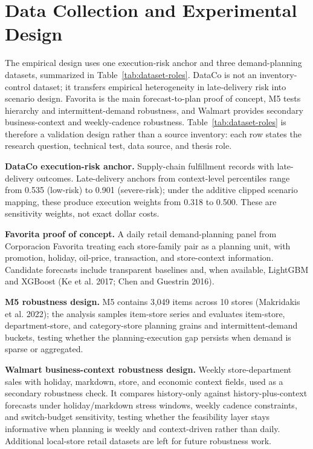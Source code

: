 \section{Data Collection and Experimental Design}

The empirical design uses one execution-risk anchor and three demand-planning datasets, summarized in Table~\ref{tab:dataset-roles}. DataCo is not an inventory-control dataset; it transfers empirical heterogeneity in late-delivery risk into scenario design. Favorita is the main forecast-to-plan proof of concept, M5 tests hierarchy and intermittent-demand robustness, and Walmart provides secondary business-context and weekly-cadence robustness. Table~\ref{tab:dataset-roles} is therefore a validation design rather than a source inventory: each row states the research question, technical test, data source, and thesis role.



\textbf{DataCo execution-risk anchor.} Supply-chain fulfillment records with late-delivery outcomes. Late-delivery anchors from context-level percentiles range from 0.535 (low-risk) to 0.901 (severe-risk); under the additive clipped scenario mapping, these produce execution weights from 0.318 to 0.500. These are sensitivity weights, not exact dollar costs.

\textbf{Favorita proof of concept.} A daily retail demand-planning panel from Corporacion Favorita treating each store-family pair as a planning unit, with promotion, holiday, oil-price, transaction, and store-context information. Candidate forecasts include transparent baselines and, when available, LightGBM and XGBoost (Ke et al. 2017; Chen and Guestrin 2016).

\textbf{M5 robustness design.} M5 contains 3,049 items across 10 stores (Makridakis et al. 2022); the analysis samples item-store series and evaluates item-store, department-store, and category-store planning grains and intermittent-demand buckets, testing whether the planning-execution gap persists when demand is sparse or aggregated.

\textbf{Walmart business-context robustness design.} Weekly store-department sales with holiday, markdown, store, and economic context fields, used as a secondary robustness check. It compares history-only against history-plus-context forecasts under holiday/markdown stress windows, weekly cadence constraints, and switch-budget sensitivity, testing whether the feasibility layer stays informative when planning is weekly and context-driven rather than daily. Additional local-store retail datasets are left for future robustness work.
